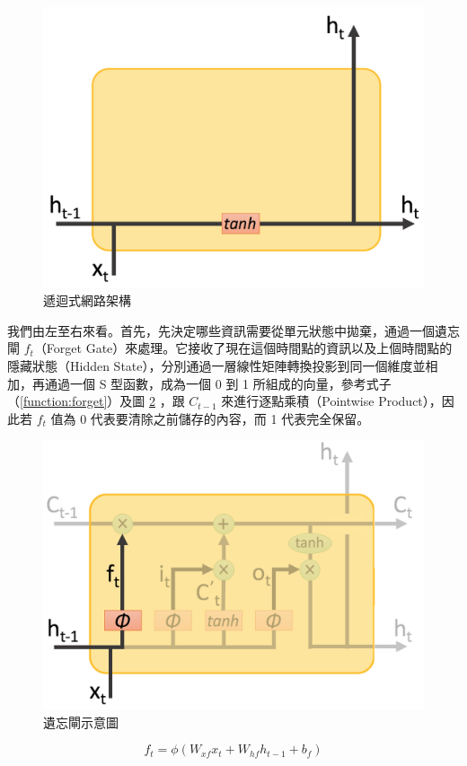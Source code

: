 \begin{figure}[h]
    \centering
    \includegraphics[scale=0.3]{images/chap2_rnnstruct.png}
    \caption{遞迴式網路架構}\label{fig:chap2_rnnA}
\end{figure}
我們由左至右來看。首先，先決定哪些資訊需要從單元狀態中拋棄，通過一個遺忘閘 $f_t$（Forget Gate）來處理。它接收了現在這個時間點的資訊以及上個時間點的隱藏狀態（Hidden State），分別通過一層線性矩陣轉換投影到同一個維度並相加，再通過一個 S 型函數，成為一個 0 到 1 所組成的向量，參考式子（\ref{function:forget}）及圖 \ref{fig:forget} ，跟 $C_{t-1}$ 來進行逐點乘積（Pointwise Product），因此若 $f_t$ 值為 0 代表要清除之前儲存的內容，而 1 代表完全保留。
\begin{figure}[h]
    \centering
    \includegraphics[scale=0.35]{images/chap2_forget.png}
    \caption{遺忘閘示意圖}\label{fig:forget}
\end{figure}
\begin{equation}
    f_t = \phi(W_{xf}x_t + W_{hf}h_{t-1} + b_f) \label{function:forget}
\end{equation}

